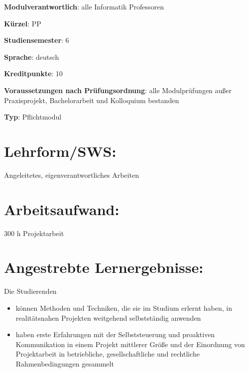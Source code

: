 \begin{modulHead}
\textbf{Modulverantwortlich}: alle Informatik
Professoren
\end{modulHead}
\begin{modulHead}
\textbf{Kürzel}:
PP
\end{modulHead}
\begin{modulHead}
\textbf{Studiensemester}:
6
\end{modulHead}
\begin{modulHead}
\textbf{Sprache}:
deutsch
\end{modulHead}
\begin{modulHead}
\textbf{Kreditpunkte}:
10
\end{modulHead}
\begin{modulHead}
\textbf{Voraussetzungen nach
Prüfungsordnung}: alle Modulprüfungen außer Praxisprojekt,
Bachelorarbeit und Kolloquium
bestanden
\end{modulHead}
\begin{modulHead}
\textbf{Typ}:
Pflichtmodul
\end{modulHead}


\section*{Lehrform/SWS:}\label{lehrformsws-18}

Angeleitetes, eigenverantwortliches Arbeiten

\section*{Arbeitsaufwand:}\label{arbeitsaufwand-17}

300 h Projektarbeit

\section*{Angestrebte
Lernergebnisse:}\label{angestrebte-lernergebnisse-18}

Die Studierenden

\begin{itemize}
\tightlist
\item
  können Methoden und Techniken, die sie im Studium erlernt haben, in
  realitätsnahen Projekten weitgehend selbstständig anwenden
\item
  haben erste Erfahrungen mit der Selbststeuerung und proaktiven
  Kommunikation in einem Projekt mittlerer Größe und der Einordnung von
  Projektarbeit in betriebliche, gesellschaftliche und rechtliche
  Rahmenbedingungen gesammelt
\end{itemize}

